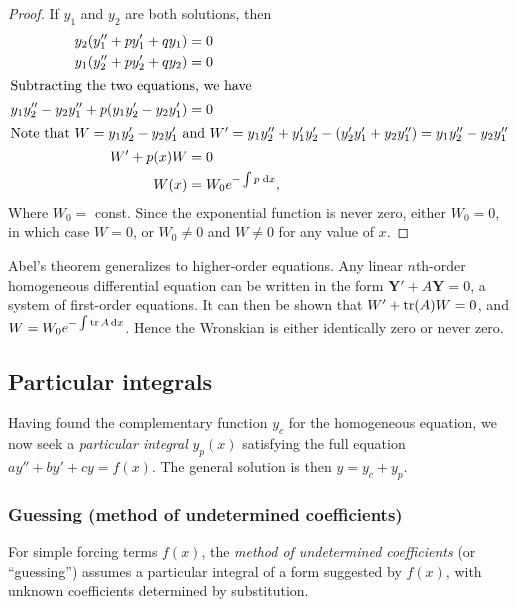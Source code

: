 \documentclass[a4paper]{article}
\begin{document}
\begin{proof}
  If $y_1$ and $y_2$ are both solutions, then
  \begin{align*}
    y_2(y_1'' + py_1' + qy_1) &= 0\\
    y_1(y_2'' + py_2' + qy_2) &= 0\\
    \intertext{Subtracting the two equations, we have}
    y_1y_2'' - y_2y_1'' + p(y_1y_2' - y_2y_1') &= 0\\
    \intertext{Note that $W =y_1y_2' - y_2y_1'$ and $W' = y_1y_2'' + y_1'y_2' - (y_2'y_1' + y_2y_1'') = y_1y_2'' - y_2y_1''$}
    W' + p(x)W &= 0\\
    W(x) &= W_0 e^{-\int p\; \mathrm{d} x},
  \end{align*}
  Where $W_0 = $ const. Since the exponential function is never zero, either $W_0 = 0$, in which case $W = 0$, or $W_0 \not= 0$ and $W \not= 0$ for any value of $x$.
\end{proof}
\begin{remark}
  Abel's theorem generalizes to higher-order equations. Any linear $n$th-order homogeneous differential equation can be written in the form $\mathbf{Y}' + A\mathbf{Y} = 0$, a system of first-order equations. It can then be shown that $W' + \operatorname{tr}(A)W = 0$, and $W = W_0e^{-\int \operatorname{tr} A\,\mathrm{d} x}$. Hence the Wronskian is either identically zero or never zero.
\end{remark}

\subsection{Particular integrals}
\begin{remark}[Goal]
  Having found the complementary function $y_c$ for the homogeneous equation, we now seek a \emph{particular integral} $y_p(x)$ satisfying the full equation $ay'' + by' + cy = f(x)$. The general solution is then $y = y_c + y_p$.
\end{remark}

\subsubsection{Guessing (method of undetermined coefficients)}
\begin{defi}
  For simple forcing terms $f(x)$, the \emph{method of undetermined coefficients} (or ``guessing'') assumes a particular integral of a form suggested by $f(x)$, with unknown coefficients determined by substitution.
\end{defi}
\end{document}
